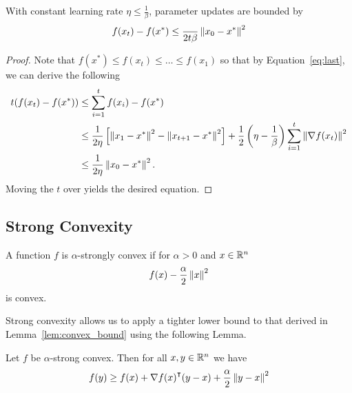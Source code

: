 \begin{corollary}
    With constant learning rate $\eta \leq \frac{1}{\beta}$, parameter updates are
    bounded by
    \begin{equation}
        f(x_t) - f(x^*) \leq \frac{}{2t\beta} \left\| x_0 - x^* \right\|^2
    \end{equation}
\end{corollary}


\begin{proof}
    Note that $f(x^*) \leq f(x_t) \leq \dots \leq f(x_1)$ so that by
    Equation~\ref{eq:last}, we can derive the following
    \begin{equation}
        \begin{aligned}
            t(f(x_t) - f(x^*)) &\leq \sum_{i = 1}^t f(x_i) - f(x^*) \\
        &\leq
        \frac{1}{2\eta}\left[\left\| x_1 - x^* \right\|^2 - \left\| x_{t+1} - x^* \right\|^2 \right]
            + \frac{1}{2} \left(\eta - \frac{1}{\beta}\right)\sum_{i = 1}^t
            \left\| \nabla f(x_t) \right\|^2 \\
        &\leq
        \frac{1}{2\eta}\left\| x_0 - x^* \right\|^2.
        \end{aligned}
    \end{equation}
    Moving the $t$ over yields the desired equation.
\end{proof}


\subsection{Strong Convexity}

\begin{definition}
    A function $f$ is $\alpha$-strongly convex if for $\alpha > 0$ and $x \in
    \mathbb R^n$
    \begin{equation}
        f(x) - \frac{\alpha}{2}\left\| x \right\|^2   
    \end{equation}
    is convex.
\end{definition}

Strong convexity allows us to apply a tighter lower bound to that derived in
Lemma~\ref{lem:convex_bound} using the following Lemma.

\begin{lemma}
    Let $f$ be $\alpha$-strong convex. Then for all $x, y \in \mathbb R^n$ we have 
    \begin{equation}
        f(y) \geq f(x) + \nabla {f(x)}^\intercal(y - x) + \frac{\alpha}{2}
        \left\| y - x \right\|^2
    \end{equation}
\end{lemma}

